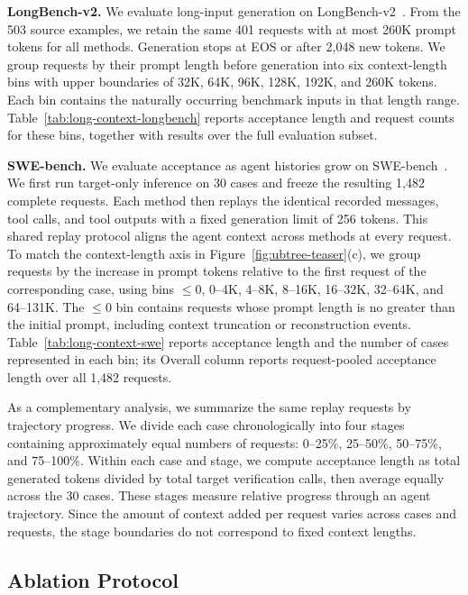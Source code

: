 \noindent\textbf{LongBench-v2.}
We evaluate long-input generation on LongBench-v2~\citep{bai2024longbenchv2}. From the 503 source examples, we retain the same 401 requests with at most 260K prompt tokens for all methods. Generation stops at EOS or after 2,048 new tokens. We group requests by their prompt length before generation into six context-length bins with upper boundaries of 32K, 64K, 96K, 128K, 192K, and 260K tokens. Each bin contains the naturally occurring benchmark inputs in that length range. Table~\ref{tab:long-context-longbench} reports acceptance length and request counts for these bins, together with results over the full evaluation subset.

\noindent\textbf{SWE-bench.}
We evaluate acceptance as agent histories grow on SWE-bench~\citep{jimenez2024swebench}. We first run target-only inference on 30 cases and freeze the resulting 1,482 complete requests. Each method then replays the identical recorded messages, tool calls, and tool outputs with a fixed generation limit of 256 tokens. This shared replay protocol aligns the agent context across methods at every request. To match the context-length axis in Figure~\ref{fig:ubtree-teaser}(c), we group requests by the increase in prompt tokens relative to the first request of the corresponding case, using bins $\le0$, 0--4K, 4--8K, 8--16K, 16--32K, 32--64K, and 64--131K. The $\le0$ bin contains requests whose prompt length is no greater than the initial prompt, including context truncation or reconstruction events. Table~\ref{tab:long-context-swe} reports acceptance length and the number of cases represented in each bin; its Overall column reports request-pooled acceptance length over all 1,482 requests.

As a complementary analysis, we summarize the same replay requests by trajectory progress. We divide each case chronologically into four stages containing approximately equal numbers of requests: 0--25\%, 25--50\%, 50--75\%, and 75--100\%. Within each case and stage, we compute acceptance length as total generated tokens divided by total target verification calls, then average equally across the 30 cases. These stages measure relative progress through an agent trajectory. Since the amount of context added per request varies across cases and requests, the stage boundaries do not correspond to fixed context lengths.

\subsection{Ablation Protocol}
\label{app:ablation-protocol}



